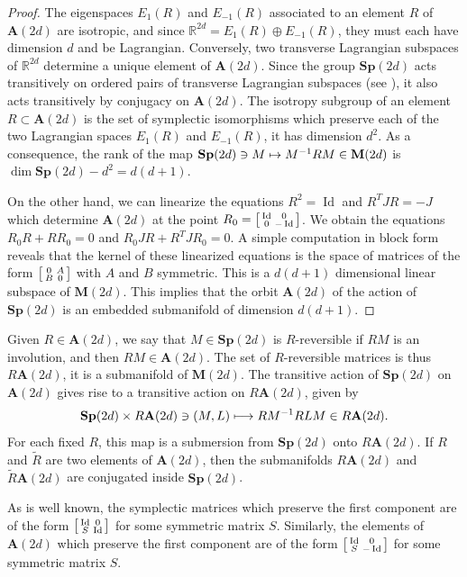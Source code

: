 \documentclass[JEP,XML,SOM,Unicode,published]{cedram}
\newcommand\mto{\mathchoice{\longmapsto}{\mapsto}{\mapsto}{\mapsto}}
\newenvironment{smallbmatrix}{\big[\begin{smallmatrix}}{\end{smallmatrix}\big]}
\DeclareMathOperator{\Id}{Id}
\newcommand{\Rm}{\mathbb{R}}
\newcommand{\Sp}{\mathbf{Sp}}
\newcommand{\A}{\mathbf{A}}
\newcommand{\M}{\mathbf{M}}
\theoremstyle{plain}
\theoremstyle{definition}
\begin{document}
\begin{proof}
The eigenspaces $E_1(R)$ and $E_{-1}(R)$ associated to
an element $R$ of $\A(2d)$ are isotropic, and since $\Rm^{2d}=E_1(R)\oplus E_{-1}(R)$,
they must each have dimension $d$ and be Lagrangian.
Conversely, two transverse Lagrangian subspaces of $\Rm^{2d}$ determine a unique element of $\A(2d)$. Since the group $\Sp(2d)$ acts transitively on ordered pairs of transverse Lagrangian subspaces
(see \eg \cite[Th.\,1.26]{dG}), it also acts transitively by conjugacy on $\A(2d)$. The isotropy subgroup of an element $R\subset \A(2d)$ is the set of symplectic isomorphisms which preserve each of the two Lagrangian spaces $E_1(R)$ and $E_{-1}(R)$, it has dimension $d^2$. As a consequence, the rank of the map $\Sp(2d)\ni M\mto M^{-1}RM\in \M(2d)$ is $\dim \Sp(2d)-d^2=d(d+1)$.

On the other hand, we can linearize the equations $R^2=\Id$ and $R^TJR=-J$ which determine $\A(2d)$ at the point
$R_0=\begin{smallbmatrix} \Id&0\\0&-\Id\end{smallbmatrix}$.
We obtain the equations $R_0R+RR_0=0$ and $R_0JR+R^TJR_0=0$.
A simple computation in block form reveals that the kernel of these linearized equations is the space of matrices of the form
$\begin{smallbmatrix} 0&A\\B&0\end{smallbmatrix}$ with $A$ and $B$ symmetric.
This is a $d(d+1)$ dimensional linear subspace of $\M(2d)$. This implies that the orbit $\A(2d)$ of the action of $\Sp(2d)$ is an embedded submanifold of dimension $d(d+1)$.
\end{proof}

Given $R\in \A(2d)$, we say that $M\in \Sp(2d)$ is $R$-reversible if $RM$ is an involution, and then $RM\in \A(2d)$. The set of $R$-reversible matrices is thus $R\A(2d)$, it is a submanifold of $\M(2d)$. The transitive action of $\Sp(2d)$ on $\A(2d)$
gives rise to a transitive action on $R\A(2d)$, given by
\[
\Sp(2d)\times R\A(2d) \ni(M, L)\mto RM^{-1}RLM\in R\A(2d).
\]
For each fixed $R$, this map is a submersion from $\Sp(2d)$ onto $R\A(2d)$.
If $R$ and $\tilde R$ are two elements of $\A(2d)$, then the submanifolds $R\A(2d)$ and $\tilde R\A(2d)$ are conjugated inside $\Sp(2d)$.

As is well known, the symplectic matrices which preserve the first component are of the form $\begin{smallbmatrix} \Id&0\\S&\Id\end{smallbmatrix}$ for some symmetric matrix $S$. Similarly,
the elements of $\A(2d)$
which preserve the first component are of the form $\begin{smallbmatrix} \Id&0\\S&-\Id\end{smallbmatrix}$ for some symmetric matrix $S$.
\end{document}
